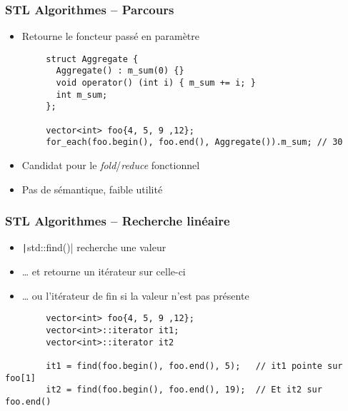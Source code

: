 \documentclass[C++.tex]{subfiles}
\begin{document}
\begin{frame}[fragile]
	\frametitle{STL Algorithmes -- Parcours}
	\begin{itemize}
		\item Retourne le foncteur passé en paramètre
	\end{itemize}

	\begin{verbatim}
		struct Aggregate {
		  Aggregate() : m_sum(0) {}
		  void operator() (int i) { m_sum += i; }
		  int m_sum;
		};

		vector<int> foo{4, 5, 9 ,12};
		for_each(foo.begin(), foo.end(), Aggregate()).m_sum; // 30
	\end{verbatim}

	\begin{itemize}
		\item Candidat pour le \textit{fold}/\textit{reduce} fonctionnel
		\item Pas de sémantique, faible utilité
	\end{itemize}
\end{frame}

\begin{frame}[fragile]
	\frametitle{STL Algorithmes -- Recherche linéaire}
	\begin{itemize}
		\item \texttt|std::find()| recherche une valeur
		\item \ldots{} et retourne un itérateur sur celle-ci
		\item \ldots{} ou l'itérateur de fin si la valeur n'est pas présente
	\end{itemize}

	\begin{verbatim}
		vector<int> foo{4, 5, 9 ,12};
		vector<int>::iterator it1;
		vector<int>::iterator it2

		it1 = find(foo.begin(), foo.end(), 5);   // it1 pointe sur foo[1]
		it2 = find(foo.begin(), foo.end(), 19);  // Et it2 sur foo.end()
	\end{verbatim}
\end{frame}
\end{document}
